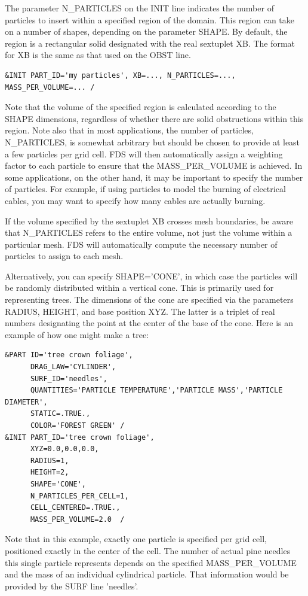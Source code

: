 \documentclass[11pt]{book}
\begin{document}
The parameter {\ct N\_PARTICLES} on the {\ct INIT} line indicates the number of particles to insert within a specified region of the domain. This region can take on a number of shapes, depending on the parameter {\ct SHAPE}. By default, the region is a rectangular solid designated with the real sextuplet {\ct XB}. The format for {\ct XB} is the same as that used on the {\ct OBST} line.
\begin{lstlisting}
&INIT PART_ID='my particles', XB=..., N_PARTICLES=..., MASS_PER_VOLUME=... /
\end{lstlisting}
Note that the volume of the specified region is calculated according to the {\ct SHAPE} dimensions, regardless of whether there are solid obstructions within this region. Note also that in most applications, the number of particles, {\ct N\_PARTICLES}, is somewhat arbitrary but should be chosen to provide at least a few particles per grid cell. FDS will then automatically assign a weighting factor to each particle to ensure that the {\ct MASS\_PER\_VOLUME} is achieved. In some applications, on the other hand, it may be important to specify the number of particles. For example, if using particles to model the burning of electrical cables, you may want to specify how many cables are actually burning.

If the volume specified by the sextuplet {\ct XB} crosses mesh boundaries, be aware that {\ct N\_PARTICLES} refers to the entire volume, not just the volume within a particular mesh. FDS will automatically compute the necessary number of particles to assign to each mesh.

Alternatively, you can specify {\ct SHAPE='CONE'}, in which case the particles will be randomly distributed within a vertical cone. This is primarily used for representing trees. The dimensions of the cone are specified via the parameters {\ct RADIUS}, {\ct HEIGHT}, and base position {\ct XYZ}. The latter is a triplet of real numbers designating the point at the center of the base of the cone. Here is an example of how one might make a tree:
\begin{lstlisting}
&PART ID='tree crown foliage',
      DRAG_LAW='CYLINDER',
      SURF_ID='needles',
      QUANTITIES='PARTICLE TEMPERATURE','PARTICLE MASS','PARTICLE DIAMETER',
      STATIC=.TRUE.,
      COLOR='FOREST GREEN' /
&INIT PART_ID='tree crown foliage',
      XYZ=0.0,0.0,0.0,
      RADIUS=1,
      HEIGHT=2,
      SHAPE='CONE',
      N_PARTICLES_PER_CELL=1,
      CELL_CENTERED=.TRUE.,
      MASS_PER_VOLUME=2.0  /
\end{lstlisting}
Note that in this example, exactly one particle is specified per grid cell, positioned exactly in the center of the cell. The number of actual pine needles this single particle represents depends on the specified {\ct MASS\_PER\_VOLUME} and the mass of an individual cylindrical particle. That information would be provided by the {\ct SURF} line {\ct 'needles'}.
\end{document}
